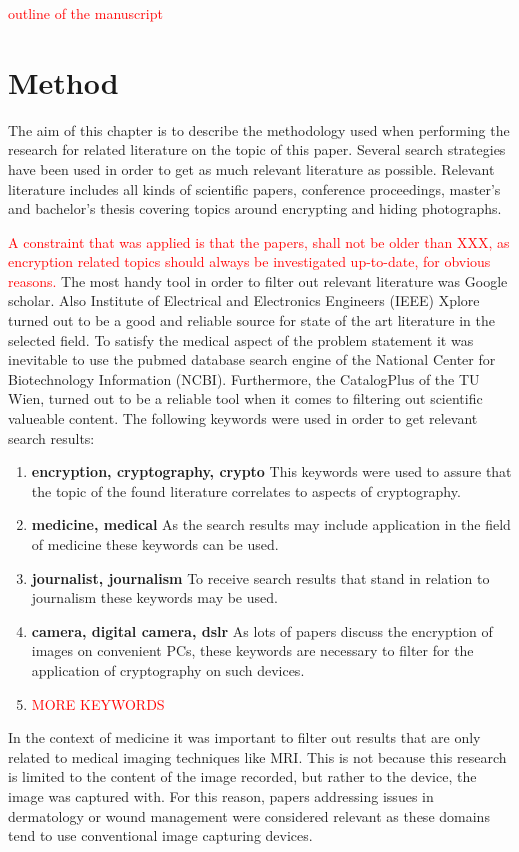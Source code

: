 \documentclass[12pt,a4paper,titlepage,oneside]{scrartcl}
\newcommand\todo[1]{\textcolor{red}{#1}}
\begin{document}
\todo{outline of the manuscript}


\newpage
\section{Method}
The aim of this chapter is to describe the methodology used when performing the research for related literature on the topic of this paper.
Several search strategies have been used in order to get as much relevant literature as possible.
Relevant literature includes all kinds of scientific papers, conference proceedings, master's and bachelor's thesis covering topics around encrypting and hiding photographs.

\todo{A constraint that was applied is that the papers, shall not be older than XXX, as encryption related topics should always be investigated up-to-date, for obvious reasons.}
The most handy tool in order to filter out relevant literature was Google scholar. 
Also Institute of Electrical and Electronics Engineers (IEEE) Xplore turned out to be a good and reliable source for state of the art literature in the selected field.
To satisfy the medical aspect of the problem statement it was inevitable to use the pubmed database search engine of the National Center for Biotechnology Information (NCBI).
Furthermore, the CatalogPlus of the TU Wien, turned out to be a reliable tool when it comes to filtering out scientific valueable content.
The following keywords were used in order to get relevant search results:
\begin{enumerate}
  \item  \textbf{encryption, cryptography, crypto}
  This keywords were used to assure that the topic of the found literature correlates to aspects of cryptography.
  \item  \textbf{medicine, medical}
  As the search results may include application in the field of medicine these keywords can be used.
  \item  \textbf{journalist, journalism}
  To receive search results that stand in relation to journalism these keywords may be used.
  \item \textbf{camera, digital camera, dslr}
  As lots of papers discuss the encryption of images on convenient PCs, these keywords are necessary to filter for the application of cryptography on such devices.
\item \todo{MORE KEYWORDS}
\end{enumerate}

In the context of medicine it was important to filter out results that are only related to medical imaging techniques like MRI.
This is not because this research is limited to the content of the image recorded, but rather to the device, the image was captured with.
For this reason, papers addressing issues in dermatology or wound management were considered relevant as these domains tend to use conventional image capturing devices.
\end{document}
